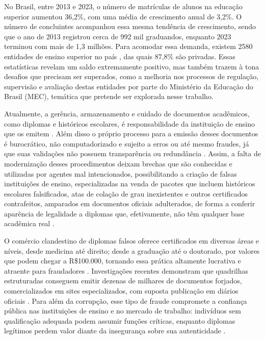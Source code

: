 No Brasil, entre 2013 e 2023, o número de matrículas de alunos na educação superior aumentou 36,2\%, com uma média de crescimento anual de 3,2\%. O número de concluintes acompanhou essa mesma tendência de crescimento, sendo que o ano de 2013 registrou cerca de 992 mil graduandos, enquanto 2023 terminou com mais de 1,3 milhões. Para acomodar essa demanda, existem 2580 entidades de ensino superior no país \cite{inep}, das quais 87,8\% são privadas. Essas estatísticas revelam um saldo extremamente positivo, mas também trazem à tona desafios que precisam ser superados, como a melhoria nos processos de regulação, supervisão e avaliação destas entidades por parte do Ministério da Educação do Brasil (MEC), temática que pretende ser explorada nesse trabalho.

Atualmente, a gerência, armazenamento e cuidado de documentos acadêmicos, como diplomas e históricos escolares, é responsabilidade da instituição de ensino que os emitem \cite{mec}. Além disso o próprio processo para a emissão desses documentos é burocrático, não computadorizado e sujeito a erros ou até mesmo fraudes, já que suas validações não possuem transparência ou redundância \cite{smartcontracts}. Assim, a falta de modernização desses procedimentos deixam brechas que são conhecidas e utilizadas por agentes mal intencionados, possibilitando a criação de falsas instituições de ensino, especializadas na venda de pacotes que incluem históricos escolares falsificados, atas de colação de grau inexistentes e outros certificados contrafeitos, amparados em documentos oficiais adulterados, de forma a conferir aparência de legalidade a diplomas que, efetivamente, não têm qualquer base acadêmica real \cite{noticiadiploma}.

O comércio clandestino de diplomas falsos oferece certificados em diversas áreas e níveis, desde medicina até direito; desde a graduação até o doutorado, por valores que podem chegar a R\$100.000, tornando essa prática altamente lucrativa e atraente para fraudadores \cite{smartcontracts}. Investigações recentes demonstram que quadrilhas estruturadas conseguem emitir dezenas de milhares de documentos forjados, comercializados em sites especializados, com suposta publicação em diários oficiais \cite{noticiadiploma2}. Para além da corrupção, esse tipo de fraude compromete a confiança pública nas instituições de ensino e no mercado de trabalho: indivíduos sem qualificação adequada podem assumir funções críticas, enquanto diplomas legítimos perdem valor diante da insegurança sobre sua autenticidade \cite{clusterfraudverification}.

